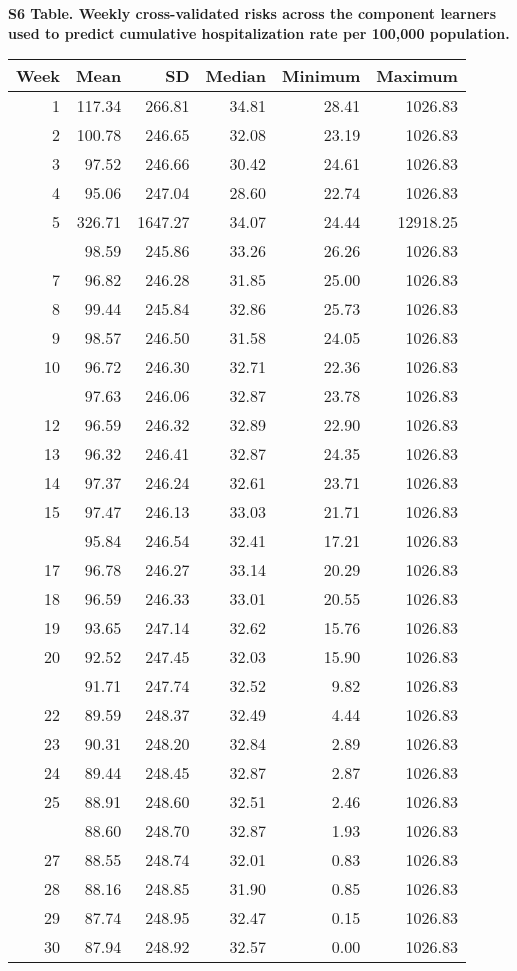 \documentclass[10pt,letterpaper]{article}
\begin{document}
\newpage

\noindent \textbf{S6 Table. Weekly cross-validated risks across the
component learners used to predict cumulative hospitalization rate per
100,000 population.}

\begin{tabular}{rrrrrr}
\toprule
Week & Mean & SD & Median & Minimum & Maximum\\
\midrule
1 & 117.34 & 266.81 & 34.81 & 28.41 & 1026.83\\
2 & 100.78 & 246.65 & 32.08 & 23.19 & 1026.83\\
3 & 97.52 & 246.66 & 30.42 & 24.61 & 1026.83\\
4 & 95.06 & 247.04 & 28.60 & 22.74 & 1026.83\\
5 & 326.71 & 1647.27 & 34.07 & 24.44 & 12918.25\\
\addlinespace
6 & 98.59 & 245.86 & 33.26 & 26.26 & 1026.83\\
7 & 96.82 & 246.28 & 31.85 & 25.00 & 1026.83\\
8 & 99.44 & 245.84 & 32.86 & 25.73 & 1026.83\\
9 & 98.57 & 246.50 & 31.58 & 24.05 & 1026.83\\
10 & 96.72 & 246.30 & 32.71 & 22.36 & 1026.83\\
\addlinespace
11 & 97.63 & 246.06 & 32.87 & 23.78 & 1026.83\\
12 & 96.59 & 246.32 & 32.89 & 22.90 & 1026.83\\
13 & 96.32 & 246.41 & 32.87 & 24.35 & 1026.83\\
14 & 97.37 & 246.24 & 32.61 & 23.71 & 1026.83\\
15 & 97.47 & 246.13 & 33.03 & 21.71 & 1026.83\\
\addlinespace
16 & 95.84 & 246.54 & 32.41 & 17.21 & 1026.83\\
17 & 96.78 & 246.27 & 33.14 & 20.29 & 1026.83\\
18 & 96.59 & 246.33 & 33.01 & 20.55 & 1026.83\\
19 & 93.65 & 247.14 & 32.62 & 15.76 & 1026.83\\
20 & 92.52 & 247.45 & 32.03 & 15.90 & 1026.83\\
\addlinespace
21 & 91.71 & 247.74 & 32.52 & 9.82 & 1026.83\\
22 & 89.59 & 248.37 & 32.49 & 4.44 & 1026.83\\
23 & 90.31 & 248.20 & 32.84 & 2.89 & 1026.83\\
24 & 89.44 & 248.45 & 32.87 & 2.87 & 1026.83\\
25 & 88.91 & 248.60 & 32.51 & 2.46 & 1026.83\\
\addlinespace
26 & 88.60 & 248.70 & 32.87 & 1.93 & 1026.83\\
27 & 88.55 & 248.74 & 32.01 & 0.83 & 1026.83\\
28 & 88.16 & 248.85 & 31.90 & 0.85 & 1026.83\\
29 & 87.74 & 248.95 & 32.47 & 0.15 & 1026.83\\
30 & 87.94 & 248.92 & 32.57 & 0.00 & 1026.83\\
\bottomrule
\end{tabular}
\end{document}
